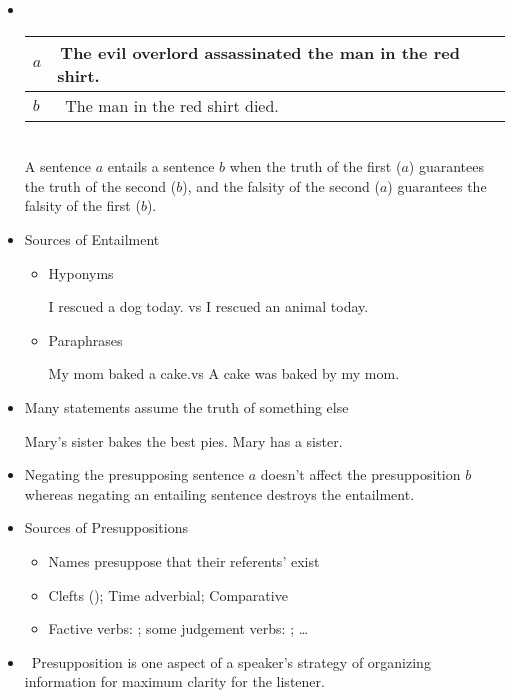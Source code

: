\documentclass[headrule,footrule]{foils}
\begin{document}
\begin{itemize}
\item {} \\[2ex]
  \begin{tabular}{ll}
    $a$ & The evil overlord  assassinated the man in the red shirt. \\ \hline
    $b$ &  The man  in the red shirt died.
  \end{tabular}
  \\[2ex]
  A sentence $a$ entails a sentence $b$ when the truth of the first ($a$)
  guarantees the truth of the second ($b$), and the falsity of the
  second ($a$) guarantees the falsity of the first ($b$).
\item Sources of Entailment
\begin{itemize}
\item Hyponyms
  \begin{exe}
    \ix I rescued a dog today. \textnormal{vs} I rescued an animal today.
  \end{exe}
\item Paraphrases
  \begin{exe}
    \ix My mom baked a cake.\textnormal{vs}  A cake was baked by my mom.
  \end{exe}
\end{itemize}
\end{itemize}


\begin{itemize}
\item Many statements assume the truth of something else
  \begin{exe}
    \ex   \begin{xlist}
    \ix Mary's sister bakes the best pies. %
    \ix Mary has a sister. %
    \end{xlist}
  \end{exe}
\item Negating the presupposing sentence $a$ doesn't affect the presupposition $b$
 whereas negating an entailing sentence destroys the entailment.
\item Sources of Presuppositions
  \begin{itemize}
  \item Names presuppose that their referents' exist
  \item Clefts (); Time adverbial; Comparative
  \item Factive verbs: ; 
    some judgement verbs: ; \ldots
  \end{itemize}
\item  Presupposition is one aspect of a speaker’s strategy of
organizing information for maximum clarity for the listener.
\end{itemize}
\end{document}
